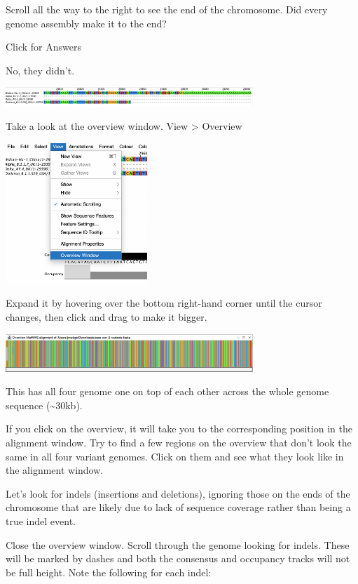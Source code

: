 \documentclass[
]{book}
\begin{document}
Scroll all the way to the right to see the end of the chromosome. Did every genome assembly make it to the end?

Click for Answers

No, they didn't.

\includegraphics[width=0.7\textwidth,height=\textheight]{./Figures/chrend.png}

\hfill\break

Take a look at the overview window.
View \textgreater{} Overview

\includegraphics[width=0.4\textwidth,height=\textheight]{./Figures/overview.png}

Expand it by hovering over the bottom right-hand corner until the cursor changes, then click and drag to make it bigger.

\includegraphics[width=0.7\textwidth,height=\textheight]{./Figures/overview_window.png}

This has all four genome one on top of each other across the whole genome sequence (\textasciitilde30kb).

If you click on the overview, it will take you to the corresponding position in the alignment window. Try to find a few regions on the overview that don't look the same in all four variant genomes. Click on them and see what they look like in the alignment window.

Let's look for indels (insertions and deletions), ignoring those on the ends of the chromosome that are likely due to lack of sequence coverage rather than being a true indel event.

Close the overview window. Scroll through the genome looking for indels. These will be marked by dashes and both the consensus and occupancy tracks will not be full height. Note the following for each indel:
\end{document}
